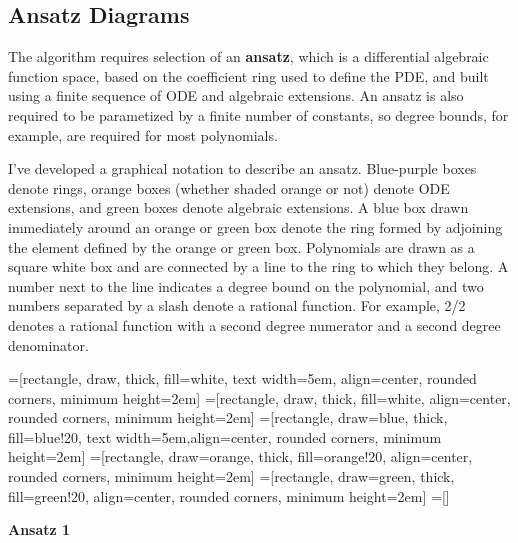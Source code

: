 \documentclass{article}
\begin{document}
\subsection*{Ansatz Diagrams}

The algorithm requires selection of an {\bf ansatz}, which is a differential
algebraic function space, based on the coefficient ring used to define the PDE,
and built using a finite sequence of ODE and algebraic extensions.  An
ansatz is also required to be parametized by a finite number of constants,
so degree bounds, for example, are required for most polynomials.

I've developed a graphical notation to describe an ansatz.  Blue-purple boxes
denote rings, orange boxes (whether shaded orange or not) denote ODE extensions, and green boxes denote
algebraic extensions.  A blue box drawn immediately around an orange or green box
denote the ring formed by adjoining the element defined by the orange or green box.
Polynomials are drawn as a square white box and are
connected by a line to the ring to which they belong.  A number next to
the line indicates a degree bound on the polynomial, and two numbers
separated by a slash denote a rational function.  For example, 2/2 denotes
a rational function with a second degree numerator and a second degree
denominator.

=[rectangle, draw, thick, fill=white, text width=5em, align=center, rounded corners, minimum height=2em]
=[rectangle, draw, thick, fill=white, align=center, rounded corners, minimum height=2em]
=[rectangle, draw=blue, thick, fill=blue!20, text width=5em,align=center, rounded corners, minimum height=2em]
=[rectangle, draw=orange, thick, fill=orange!20, align=center, rounded corners, minimum height=2em]
=[rectangle, draw=green, thick, fill=green!20, align=center, rounded corners, minimum height=2em]
=[]

{\bf Ansatz 1}
\end{document}

